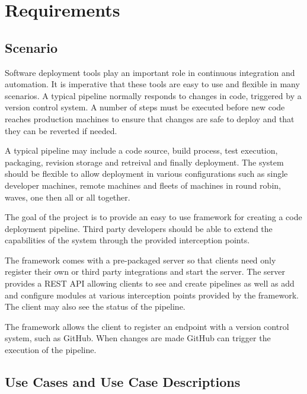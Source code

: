 \chapter{Requirements}


\section{Scenario}
Software deployment tools play an important role in continuous integration and automation.
It is imperative that these tools are easy to use and flexible in many scenarios.
A typical pipeline normally responds to changes in code, triggered by a version control
system. A number of steps must be executed before new code reaches production machines to
ensure that changes are safe to deploy and that they can be reverted if needed.

A typical pipeline may include a code source, build process, test execution, packaging,
revision storage and retreival and finally deployment. The system should be flexible to
allow deployment in various configurations such as single developer machines, remote
machines and fleets of machines in round robin, waves, one then all or all together.

The goal of the project is to provide an easy to use framework for creating a code
deployment pipeline. Third party developers should be able to extend the capabilities
of the system through the provided interception points.

The framework comes with a pre-packaged server so that clients need only register their own or
third party integrations and start the server. The server provides a REST API allowing
clients to see and create pipelines as well as add and configure modules at various
interception points provided by the framework. The client may also see the status of the
pipeline.

The framework allows the client to register an endpoint with a version control system,
such as GitHub. When changes are made GitHub can trigger the execution of the pipeline.

\section{Use Cases and Use Case Descriptions}
